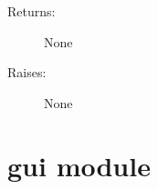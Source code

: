 \documentclass[letterpaper,10pt,english]{sphinxmanual}
\begin{document}
\begin{fulllineitems}
\begin{fulllineitems}
\begin{description}
\item[{Returns:}] \leavevmode
None

\item[{Raises:}] \leavevmode
None

\end{description}

\end{fulllineitems}


\end{fulllineitems}



\section{gui module}
\label{gui:module-gui}\label{gui:gui-module}\label{gui::doc}
\end{document}
